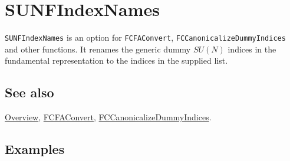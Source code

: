 \documentclass[../FeynCalcManual.tex]{subfiles}
\begin{document}
\hypertarget{sunfindexnames}{%
\section{SUNFIndexNames}\label{sunfindexnames}}

\texttt{SUNFIndexNames} is an option for \texttt{FCFAConvert},
\texttt{FCCanonicalizeDummyIndices} and other functions. It renames the
generic dummy \(SU(N)\) indices in the fundamental representation to the
indices in the supplied list.

\subsection{See also}

\hyperlink{toc}{Overview}, \hyperlink{fcfaconvert}{FCFAConvert},
\hyperlink{fccanonicalizedummyindices}{FCCanonicalizeDummyIndices}.

\subsection{Examples}
\end{document}
